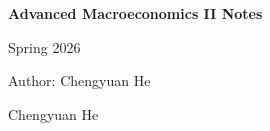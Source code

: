 \documentclass[12pt,a4paper,openany]{book}
\begin{document}
\frontmatter
\begin{titlepage}
  \centering
  \vspace*{0.18\textheight}
  {\Huge\bfseries Advanced Macroeconomics II Notes\par}
  \vspace{1.5em}
  {\Large Spring 2026\par}
  \vspace{2.5em}
  {\large Author: Chengyuan He\par}
  \vfill
  {\large Chengyuan He\par}
\end{titlepage}

\tableofcontents

\mainmatter










\end{document}
